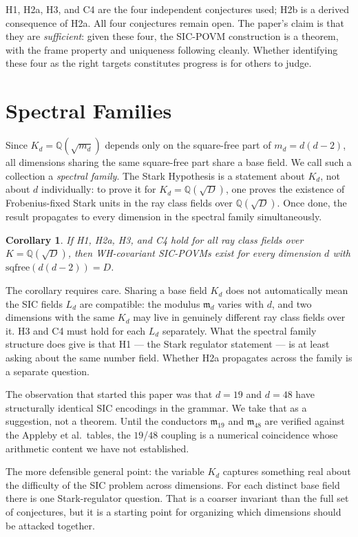 \documentclass[12pt]{article}
\theoremstyle{plain}
\newtheorem{corollaryinner}[theoreminner]{Corollary}
\theoremstyle{definition}
\theoremstyle{remark}
\newenvironment{corollary}{\begin{mdframed}[style=thmstyle]\begin{corollaryinner}}{\end{corollaryinner}\end{mdframed}}
\newcommand{\bQ}{\mathbb{Q}}
\begin{document}
H1, H2a, H3, and C4 are the four independent conjectures used; H2b is a derived consequence of H2a. All four conjectures remain open. The paper's claim is that they are \emph{sufficient}: given these four, the SIC-POVM construction is a theorem, with the frame property and uniqueness following cleanly. Whether identifying these four as the right targets constitutes progress is for others to judge.

\section{Spectral Families}
\label{sec:families}

Since $K_d = \bQ(\sqrt{m_d})$ depends only on the square-free part of $m_d = d(d-2)$, all dimensions sharing the same square-free part share a base field. We call such a collection a \emph{spectral family}. The Stark Hypothesis is a statement about $K_d$, not about $d$ individually: to prove it for $K_d = \bQ(\sqrt{D})$, one proves the existence of Frobenius-fixed Stark units in the ray class fields over $\bQ(\sqrt{D})$. Once done, the result propagates to every dimension in the spectral family simultaneously.

\begin{corollary}
  \label{cor:spectral}
  If H1, H2a, H3, and C4 hold for all ray class fields over $K = \bQ(\sqrt{D})$, then WH-covariant SIC-POVMs exist for every dimension $d$ with $\mathrm{sqfree}(d(d-2)) = D$.
\end{corollary}

The corollary requires care. Sharing a base field $K_d$ does not automatically mean the SIC fields $L_d$ are compatible: the modulus $\mathfrak{m}_d$ varies with $d$, and two dimensions with the same $K_d$ may live in genuinely different ray class fields over it. H3 and C4 must hold for each $L_d$ separately. What the spectral family structure does give is that H1 — the Stark regulator statement — is at least asking about the same number field. Whether H2a propagates across the family is a separate question.

The observation that started this paper was that $d = 19$ and $d = 48$ have structurally identical SIC encodings in the grammar. We take that as a suggestion, not a theorem. Until the conductors $\mathfrak{m}_{19}$ and $\mathfrak{m}_{48}$ are verified against the Appleby et al.\ tables, the $19$/$48$ coupling is a numerical coincidence whose arithmetic content we have not established.

The more defensible general point: the variable $K_d$ captures something real about the difficulty of the SIC problem across dimensions. For each distinct base field there is one Stark-regulator question. That is a coarser invariant than the full set of conjectures, but it is a starting point for organizing which dimensions should be attacked together.
\end{document}
